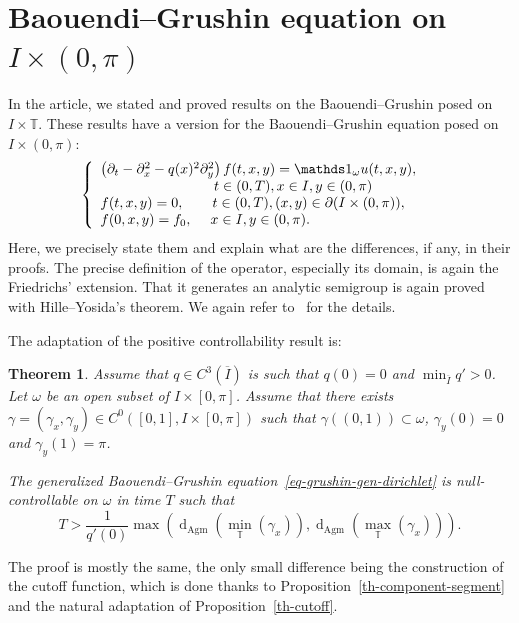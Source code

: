 \documentclass[10pt]{amsart}
\newtheorem{theo}{Theorem}[section]
\theoremstyle{definition}\newtheorem{defi}[theo]{Definition}\newtheorem{rema}[theo]{Remark}\newtheorem{exam}[theo]{Example}\newtheorem{exem}[theo]{Example}\newtheorem{nota}[theo]{Notation}
\newcommand{\1}{\mathds 1}
\newcommand{\dagmon}{\mathop{\mathrm{d}}\nolimits_{\mathrm{Agm}}}
\newcommand{\T}{\mathbb{T}}
\newcommand{\g}{\gamma}
\renewcommand{\o}{\omega}
\begin{document}
\appendix

\section{Baouendi--Grushin equation on $I\times(0,\pi)$}\label{app-dirichlet}
In the article, we stated and proved results on the Baouendi--Grushin posed on $I\times \T$. These results have a version for the Baouendi--Grushin equation posed on $I\times (0,\pi)$:
\begin{equation}\label{eq-grushin-gen-dirichlet}
\left\{
\begin{array}{ll}
\left(\partial_t-\partial_x^2 - q(x)^2 \partial_y^2\right)f(t,x,y) = \1_\o u(t,x,y),&\\
\mkern146mu t\in (0,T), x\in I, y\in (0,\pi)\\
f(t,x,y) = 0,\qquad t\in (0,T), (x,y) \in \partial (I\times (0,\pi)), \\
f(0,x,y) = f_0, \quad \; x\in I, y\in (0,\pi).
\end{array}\right.
\end{equation}
Here, we precisely state them and explain what are the differences, if any, in their proofs. The precise definition of the operator, especially its domain, is again the Friedrichs' extension. That it generates an analytic semigroup is again proved with Hille--Yosida's theorem. We again refer to~\cite{BCG14,Brezis11,Helffer13} for the details.

The adaptation of the positive controllability result is:

\begin{theo}\label{th-main-pos-dirichlet}
Assume that $q\in C^3(\overline I)$ is such that $q(0) = 0$ and $\min_{\overline I} q' >0$. Let $\o$ be an open subset of $I\times [0,\pi]$. Assume that there exists $\gamma = (\g_x, \g_y) \in C^0([0,1], I\times [0,\pi])$ such that $\g((0,1)) \subset \o$, $\g_y(0) = 0$ and $\g_y(1) = \pi$.

The generalized Baouendi--Grushin equation~\eqref{eq-grushin-gen-dirichlet} is null-controllable on $\o$ in time $T$ such that
\[
T> \frac{1}{q'(0)}\max\left(\dagmon\left(\min_\T(\g_x)\right), \dagmon\left(\max_\T (\g_x)\right)\right).
\]
\end{theo}

The proof is mostly the same, the only small difference being the construction of the cutoff function, which is done thanks to Proposition~\ref{th-component-segment} and the natural adaptation of Proposition~\ref{th-cutoff}.
\end{document}
